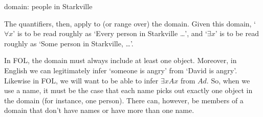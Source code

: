 \begin{earg}
\item[] domain: people in Starkville
\end{earg}
The quantifiers, then, apply to (or range over) the domain. Given this domain, ‘$\forall x$’ is to be read roughly as ‘Every person in Starkville \ldots ’, and ‘$\exists x$’ is to be read roughly as ‘Some person in Starkville, \ldots ’.

In FOL, the domain must always include at least one object. Moreover, in English we can legitimately infer ‘someone is angry’ from ‘David is angry’. Likewise in FOL, we will want to be able to infer $\exists xAx$ from $Ad$. So, when we use a name, it must be the case that each name picks out exactly one object in the domain (for instance, one person). There can, however, be members of a domain that don't have names or have more than one name.




